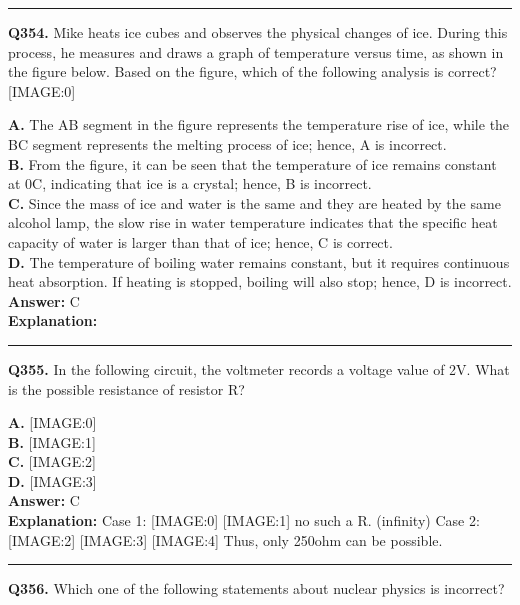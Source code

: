 \documentclass[12pt]{article}
\begin{document}
\hrule
\vspace{1em}


\noindent
\textbf{Q354.} Mike heats ice cubes and observes the physical changes of ice. During this process, he measures and draws a graph of temperature versus time, as shown in the figure below. Based on the figure, which of the following analysis is correct?
[IMAGE:0]



\textbf{A.} The AB segment in the figure represents the temperature rise of ice, while the BC segment represents the melting process of ice; hence, A is incorrect. \\
\textbf{B.} From the figure, it can be seen that the temperature of ice remains constant at 0\circ C, indicating that ice is a crystal; hence, B is incorrect. \\
\textbf{C.} Since the mass of ice and water is the same and they are heated by the same alcohol lamp, the slow rise in water temperature indicates that the specific heat capacity of water is larger than that of ice; hence, C is correct. \\
\textbf{D.} The temperature of boiling water remains constant, but it requires continuous heat absorption. If heating is stopped, boiling will also stop; hence, D is incorrect. \\

\textbf{Answer:} C \\
\textbf{Explanation:} 

\hrule
\vspace{1em}


\noindent
\textbf{Q355.} In the following circuit, the voltmeter records a voltage value of 2V.
What is the possible resistance of resistor R?



\textbf{A.} [IMAGE:0] \\
\textbf{B.} [IMAGE:1] \\
\textbf{C.} [IMAGE:2] \\
\textbf{D.} [IMAGE:3] \\

\textbf{Answer:} C \\
\textbf{Explanation:} Case 1:
[IMAGE:0]
[IMAGE:1]
no such a R. (infinity)
Case 2:
[IMAGE:2]
[IMAGE:3]
[IMAGE:4]
Thus, only 250ohm can be possible.

\hrule
\vspace{1em}


\noindent
\textbf{Q356.} Which one of the following statements about nuclear physics is incorrect?
\end{document}
